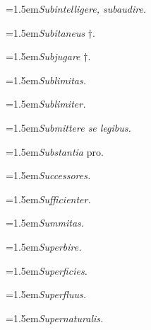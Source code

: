 \par{\dictfontsize\hangindent=1.5em\noindent \textit{Subintelligere, subaudire.} \par}
\par{\dictfontsize\hangindent=1.5em\noindent \textit{Subitaneus} †. \par}
\par{\dictfontsize\hangindent=1.5em\noindent \textit{Subjugare} †. \par}
\par{\dictfontsize\hangindent=1.5em\noindent \textit{Sublimitas.} \par}
\par{\dictfontsize\hangindent=1.5em\noindent \textit{Sublimiter.} \par}
\par{\dictfontsize\hangindent=1.5em\noindent \textit{Submittere se legibus.} \par}
\par{\dictfontsize\hangindent=1.5em\noindent \textit{Substantia} pro. \par}
\par{\dictfontsize\hangindent=1.5em\noindent \textit{Successores.} \par}
\par{\dictfontsize\hangindent=1.5em\noindent \textit{Sufficienter.} \par}
\par{\dictfontsize\hangindent=1.5em\noindent \textit{Summitas.} \par}
\par{\dictfontsize\hangindent=1.5em\noindent \textit{Superbire.} \par}
\par{\dictfontsize\hangindent=1.5em\noindent \textit{Superficies.} \par}
\par{\dictfontsize\hangindent=1.5em\noindent \textit{Superfluus.} \par}
\par{\dictfontsize\hangindent=1.5em\noindent \textit{Supernaturalis.} \par}
